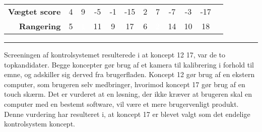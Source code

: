 \begin{table}[H]
\begin{tabular}{|p{2cm}|c c c c c c c c c c c|}
        \multicolumn{1}{|r|}{\cellcolor{lightgray!10} \textbf{Vægtet score}}& 4 & 9 & -5 & -1 & -15 & 2 & 7 & -7 & -3 & \multicolumn{1}{c}{-17} &\multicolumn{1}{|c}{} \\\cline{1-11} 
        
        \multicolumn{1}{|r|}{\cellcolor{lightgray!10}\textbf{Rangering}} & 5 & \multicolumn{1}{c}{\cellcolor{OliveGreen} \textcolor{white}{\textbf{1}}} & 11 & 9 & 17 & 6 &  \multicolumn{1}{c}{\cellcolor{OliveGreen} \textcolor{white}{\textbf{2}}} & 14 & 10 & \multicolumn{1}{c}{18} & \multicolumn{1}{|c}{} \\\cline{1-11}
    \end{tabular}
    \label{tab:selektionsskema kontrolsystem}
\end{table}
\plainbreak{1}
Screeningen af kontrolsystemet resulterede i at koncept 12 17, var de to topkandidater. Begge koncepter gør brug af et kamera til kalibrering i forhold til emne, og adskiller sig derved fra brugerfladen. Koncept 12 gør brug af en ekstern computer, som brugeren selv medbringer, hvorimod koncept 17 gør brug af en touch skærm. Det er vurderet at en løsning, der ikke kræver at brugeren skal en computer med en bestemt software, vil være et mere brugervenligt produkt. Denne vurdering har resulteret i, at koncept 17 er blevet valgt som det endelige kontrolsystem koncept.


